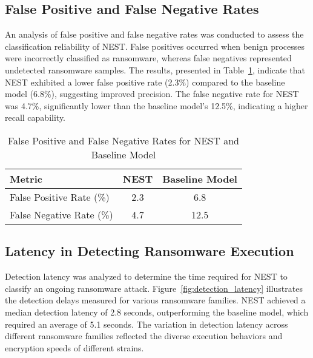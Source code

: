 \documentclass[lettersize,journal]{IEEEtran}
\begin{document}
\subsection{False Positive and False Negative Rates}

An analysis of false positive and false negative rates was conducted to assess the classification reliability of NEST. False positives occurred when benign processes were incorrectly classified as ransomware, whereas false negatives represented undetected ransomware samples. The results, presented in Table~\ref{tab:false_rates}, indicate that NEST exhibited a lower false positive rate (2.3\%) compared to the baseline model (6.8\%), suggesting improved precision. The false negative rate for NEST was 4.7\%, significantly lower than the baseline model’s 12.5\%, indicating a higher recall capability.

\begin{table}[h]
	\centering
	\caption{False Positive and False Negative Rates for NEST and Baseline Model}
	\label{tab:false_rates}
	\begin{tabular}{|l|c|c|}
		\hline
		\textbf{Metric} & \textbf{NEST} & \textbf{Baseline Model} \\
		\hline
		False Positive Rate (\%) & 2.3 & 6.8 \\
		False Negative Rate (\%) & 4.7 & 12.5 \\
		\hline
	\end{tabular}
\end{table}

\subsection{Latency in Detecting Ransomware Execution}

Detection latency was analyzed to determine the time required for NEST to classify an ongoing ransomware attack. Figure~\ref{fig:detection_latency} illustrates the detection delays measured for various ransomware families. NEST achieved a median detection latency of 2.8 seconds, outperforming the baseline model, which required an average of 5.1 seconds. The variation in detection latency across different ransomware families reflected the diverse execution behaviors and encryption speeds of different strains.
\end{document}
